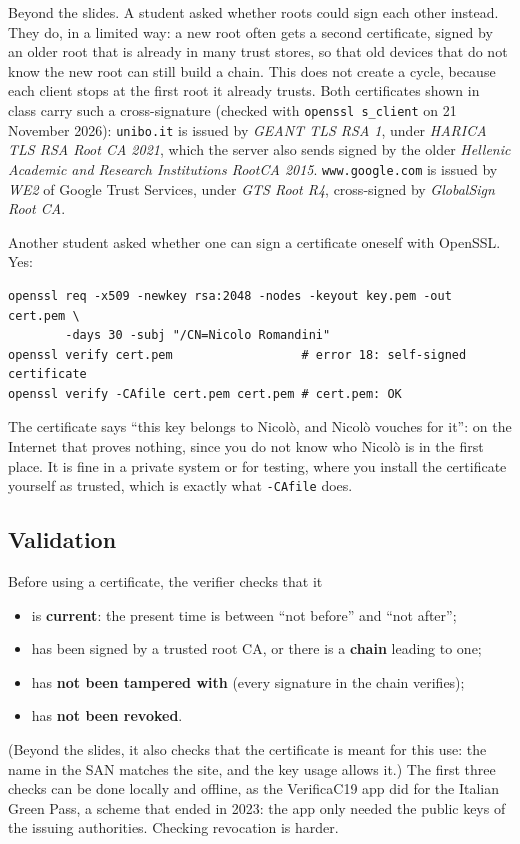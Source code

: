 \begin{remark}
Beyond the slides. A student asked whether roots could sign each other instead. They do, in a limited way: a new root often gets a second certificate, signed by an older root that is already in many trust stores, so that old devices that do not know the new root can still build a chain. This does not create a cycle, because each client stops at the first root it already trusts. Both certificates shown in class carry such a cross-signature (checked with \texttt{openssl s\_client} on 21 November 2026): \texttt{unibo.it} is issued by \emph{GEANT TLS RSA 1}, under \emph{HARICA TLS RSA Root CA 2021}, which the server also sends signed by the older \emph{Hellenic Academic and Research Institutions RootCA 2015}. \texttt{www.google.com} is issued by \emph{WE2} of Google Trust Services, under \emph{GTS Root R4}, cross-signed by \emph{GlobalSign Root CA}.
\end{remark}

\begin{remark}
Another student asked whether one can sign a certificate oneself with OpenSSL. Yes:
\begin{verbatim}
openssl req -x509 -newkey rsa:2048 -nodes -keyout key.pem -out cert.pem \
        -days 30 -subj "/CN=Nicolo Romandini"
openssl verify cert.pem                  # error 18: self-signed certificate
openssl verify -CAfile cert.pem cert.pem # cert.pem: OK
\end{verbatim}
The certificate says \enquote{this key belongs to Nicolò, and Nicolò vouches for it}: on the Internet that proves nothing, since you do not know who Nicolò is in the first place. It is fine in a private system or for testing, where you install the certificate yourself as trusted, which is exactly what \texttt{-CAfile} does.
\end{remark}

\subsection{Validation}

Before using a certificate, the verifier checks that it
\begin{itemize}
    \item is \textbf{current}: the present time is between \enquote{not before} and \enquote{not after};
    \item has been signed by a trusted root CA, or there is a \textbf{chain} leading to one;
    \item has \textbf{not been tampered with} (every signature in the chain verifies);
    \item has \textbf{not been revoked}.
\end{itemize}
(Beyond the slides, it also checks that the certificate is meant for this use: the name in the SAN matches the site, and the key usage allows it.) The first three checks can be done locally and offline, as the VerificaC19 app did for the Italian Green Pass, a scheme that ended in 2023: the app only needed the public keys of the issuing authorities. Checking revocation is harder.

